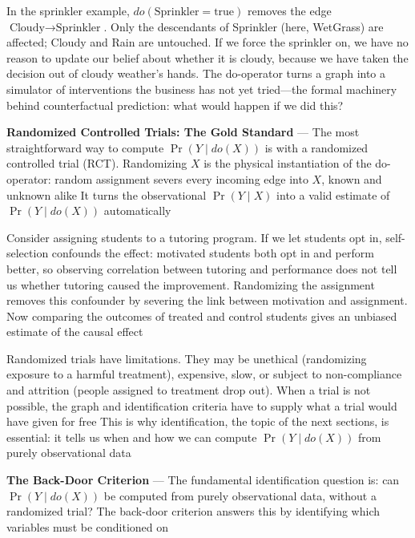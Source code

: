 In the sprinkler example, $do(\text{Sprinkler}= \text{true})$ removes the edge
$\text{Cloudy}\to \text{Sprinkler}$. Only the descendants of Sprinkler (here, WetGrass)
are affected; Cloudy and Rain are untouched. If we force the sprinkler on, we have
no reason to update our belief about whether it is cloudy, because we have taken
the decision out of cloudy weather's hands. The do-operator turns a graph into a
simulator of interventions the business has not yet tried—the formal machinery behind
counterfactual prediction: what would happen if we did this?


\textbf{Randomized Controlled Trials: The Gold Standard} --- The most
straightforward way to compute $\Pr(Y \mid do(X))$ is with a randomized
controlled trial (RCT). Randomizing $X$ is the physical instantiation of the do-operator:
random assignment severs every incoming edge into $X$, known and unknown alike It
turns the observational $\Pr(Y \mid X)$ into a valid estimate of $\Pr(Y \mid do(X
))$ automatically

Consider assigning students to a tutoring program. If we let students opt in,
self-selection confounds the effect: motivated students both opt in and perform better,
so observing correlation between tutoring and performance does not tell us
whether tutoring caused the improvement. Randomizing the assignment removes this
confounder by severing the link between motivation and assignment. Now comparing
the outcomes of treated and control students gives an unbiased estimate of the
causal effect

Randomized trials have limitations. They may be unethical (randomizing exposure to
a harmful treatment), expensive, slow, or subject to non-compliance and attrition
(people assigned to treatment drop out). When a trial is not possible, the graph
and identification criteria have to supply what a trial would have given for free
This is why identification, the topic of the next sections, is essential: it tells
us when and how we can compute $\Pr(Y \mid do(X))$ from purely observational data

\textbf{The Back-Door Criterion} --- The fundamental identification question is:
can $\Pr(Y \mid do(X))$ be computed from purely observational data, without a randomized
trial? The back-door criterion answers this by identifying which variables must
be conditioned on

